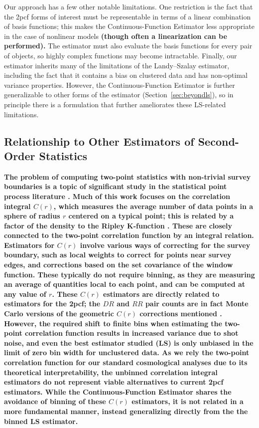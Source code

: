 \documentclass[modern]{aastex62}
\newcommand{\cf}{2pcf\xspace}
\newcommand{\est}{the Continuous-Function Estimator\xspace}
\newcommand{\LS}{LS\xspace}
\newcommand{\new}[1]{\textbf{#1}}
\begin{document}
Our approach has a few other notable limitations.
One restriction is the fact that the \cf forms of interest must be representable in terms of a linear combination of basis functions; this makes \est less appropriate in the case of nonlinear models \new{(though often a linearization can be performed).}
The estimator must also evaluate the basis functions for every pair of objects, so highly complex functions may become intractable.
Finally, our estimator inherits many of the limitations of the Landy--Szalay estimator, including the fact that it contains a bias on clustered data and has non-optimal variance properties.
However, \est is further generalizable to other forms of the estimator (Section~\ref{sec:beyondls}), so in principle there is a formulation that further ameliorates these \LS-related limitations.

\subsection{Relationship to Other Estimators of Second-Order Statistics}
\label{sec:otherest}

\new{The problem of computing two-point statistics with non-trivial survey boundaries is a topic of significant study in the statistical point process literature \citep{Ripley1981, Illian2008, Diggle2013}.
Much of this work focuses on the correlation integral $C(r)$, which measures the average number of data points in a sphere of radius $r$ centered on a typical point; this is related by a factor of the density to the Ripley K-function \citep{Ripley1976}. These are closely connected to the two-point correlation function by an integral relation.
Estimators for $C(r)$ involve various ways of correcting for the survey boundary, such as local weights to correct for points near survey edges, and corrections based on the set covariance of the window function.
These typically do not require binning, as they are measuring an average of quantities local to each point, and can be computed at any value of $r$.
These $C(r)$ estimators are directly related to estimators for the \cf; the $DR$ and $RR$ pair counts are in fact Monte Carlo versions of the geometric $C(r)$ corrections mentioned \citep{Kerscher1999}.
However, the required shift to finite bins when estimating the two-point correlation function results in increased variance due to shot noise, and even the best estimator studied (\LS) is only unbiased in the limit of zero bin width for unclustered data.
As we rely the two-point correlation function for our standard cosmological analyses due to its theoretical interpretability, the unbinned correlation integral estimators do not represent viable alternatives to current \cf estimators.
While \est shares the avoidance of binning of these $C(r)$ estimators, it is not related in a more fundamental manner, instead generalizing directly from the the binned \LS estimator.}
\end{document}
